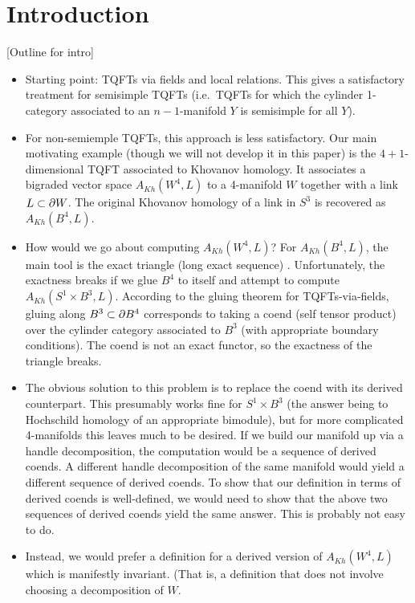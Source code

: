 \documentclass[11pt,leqno]{amsart}
\begin{document}
\section{Introduction}

[Outline for intro]
\begin{itemize}
\item Starting point: TQFTs via fields and local relations.
This gives a satisfactory treatment for semisimple TQFTs
(i.e.\ TQFTs for which the cylinder 1-category associated to an
$n{-}1$-manifold $Y$ is semisimple for all $Y$).
\item For non-semiemple TQFTs, this approach is less satisfactory.
Our main motivating example (though we will not develop it in this paper)
is the $4{+}1$-dimensional TQFT associated to Khovanov homology.
It associates a bigraded vector space $A_{Kh}(W^4, L)$ to a 4-manifold $W$ together
with a link $L \subset \partial W$.
The original Khovanov homology of a link in $S^3$ is recovered as $A_{Kh}(B^4, L)$.
\item How would we go about computing $A_{Kh}(W^4, L)$?
For $A_{Kh}(B^4, L)$, the main tool is the exact triangle (long exact sequence)
.
Unfortunately, the exactness breaks if we glue $B^4$ to itself and attempt
to compute $A_{Kh}(S^1\times B^3, L)$.
According to the gluing theorem for TQFTs-via-fields, gluing along $B^3 \subset \partial B^4$
corresponds to taking a coend (self tensor product) over the cylinder category
associated to $B^3$ (with appropriate boundary conditions).
The coend is not an exact functor, so the exactness of the triangle breaks.
\item The obvious solution to this problem is to replace the coend with its derived counterpart.
This presumably works fine for $S^1\times B^3$ (the answer being to Hochschild homology
of an appropriate bimodule), but for more complicated 4-manifolds this leaves much to be desired.
If we build our manifold up via a handle decomposition, the computation
would be a sequence of derived coends.
A different handle decomposition of the same manifold would yield a different
sequence of derived coends.
To show that our definition in terms of derived coends is well-defined, we
would need to show that the above two sequences of derived coends yield the same answer.
This is probably not easy to do.
\item Instead, we would prefer a definition for a derived version of $A_{Kh}(W^4, L)$
which is manifestly invariant.
(That is, a definition that does not
involve choosing a decomposition of $W$.

\end{itemize}
\end{document}
